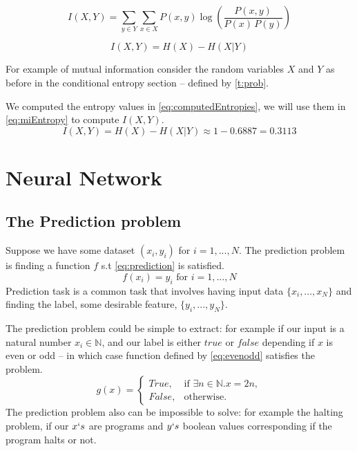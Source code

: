 \documentclass[dissertation.tex]{subfiles}
\begin{document}
\begin{equation}
      I(X,Y)=\sum _{y\in Y}\sum _{x\in X}{P(x,y)\log {\left({\frac
      {P(x,y)}{P(x)\,P(y)}}\right)}} 
\label{eq:miExplicit}
\end{equation}

\begin{equation}
  I(X, Y) = H(X) - H(X|Y)
\label{eq:miEntropy}
\end{equation}

For example of mutual information consider the random variables $X$ and $Y$ as
before in the conditional entropy section -- defined by \autoref{t:prob}. 

We computed the entropy values in \autoref{eq:computedEntropies}, we will use
them in \autoref{eq:miEntropy} to compute $I(X,Y)$.
\begin{equation}
  I(X,Y) = H(X) - H(X|Y) \approx 1 - 0.6887 = 0.3113
\end{equation}

\section{Neural Network}
\label{sec:NN}

\subsection{The Prediction problem} 

Suppose we have some dataset $(x_i, y_i)$ for $i = 1,...,N$. The prediction
problem is finding a function $f$ s.t \autoref{eq:prediction} is satisfied.
\begin{equation}
  f(x_i) = y_i \text{ for } i = 1,...,N
  \label{eq:prediction}
\end{equation}
Prediction task is a common task that involves having input data
$\{x_i,...,x_N\}$ and finding the label, some desirable feature,
$\{y_i,...,y_N\}$. 

The prediction problem could be simple to extract: for example if our input is a
natural number $x_i\in\mathbb{N}$, and our label is either $true$ or $false$
depending if $x$ is even or odd -- in which case function defined by
\autoref{eq:evenodd} satisfies the problem.  \begin{equation}
  g(x) = \begin{cases}
    True, & \text{if } \exists n\in\mathbb{N}.x = 2n , \\
    False, & \text{otherwise}.
  \end{cases}
\label{eq:evenodd}
\end{equation}
The prediction problem also can be impossible to solve: for example the halting
problem, if our $x`s$ are programs and $y`s$ boolean values corresponding if the
program halts or not.
\end{document}
